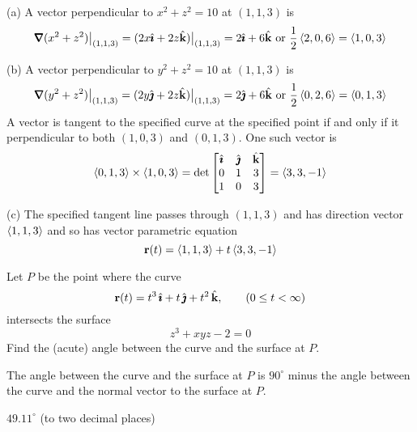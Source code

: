 \begin{solution}
(a) 
A vector perpendicular to $x^2+z^2=10$ at $(1,1,3)$ is
\begin{equation*}
\vnabla(x^2+z^2)\big|_{(1,1,3)}
=(2x\hi+2z\hk)\big|_{(1,1,3)}
=2\hi+6\hk\hbox{ or }
\frac{1}{2} \llt 2,0,6\rgt=\llt 1,0,3\rgt
\end{equation*}

(b) A vector perpendicular to $y^2+z^2=10$ at $(1,1,3)$ is
\begin{equation*}
\vnabla(y^2+z^2)\big|_{(1,1,3)}
=(2y\hj+2z\hk)\big|_{(1,1,3)}
=2\hj+6\hk\hbox{ or }\frac{1}{2} \llt 0,2,6\rgt=\llt 0,1,3\rgt
\end{equation*}
A vector is tangent to the specified curve at the specified point if and only
if it  perpendicular to both $(1,0,3)$ and $(0,1,3)$. One such vector is
\begin{equation*}
\left< 0,1,3\right>\times\left<1,0,3\right>
=\det\left[\begin{matrix}
                     \hat{\pmb{\imath}} & \hat{\pmb{\jmath}} & \hat{\mathbf{k}} \\
                     0   &  1  & 3 \\
                     1   &  0  & 3
                \end{matrix}\right]
=\left< 3,3,-1\right>
\end{equation*}

(c) The specified tangent line passes through $(1,1,3)$ and has direction
vector $\left< 1,1,3\right>$ and so has vector parametric equation
$$
\mathbf{r}(t)=\left< 1,1,3\right>+t\left< 3,3,-1\right>
$$
\end{solution}

\begin{question}[M200 2000A] %
Let $P$ be the point where the curve 
\begin{equation*}
\mathbf{r}(t) = t^3\,\hat{\pmb{\imath}} + t\,\hat{\pmb{\jmath}} + t^2\,\hat{\mathbf{k}},\qquad (0 \le t <\infty)
\end{equation*}
 intersects the surface 
\begin{equation*}
z^3 + xyz -2 = 0
\end{equation*}
Find the (acute) angle between the curve and the surface at $P$. 
\end{question}

\begin{hint}
 The angle between the curve and the surface at $P$ is $90^\circ$
minus the angle between the curve and the normal vector to the surface at $P$.
\end{hint}

\begin{answer}
$49.11^\circ$ (to two decimal places)
\end{answer}

